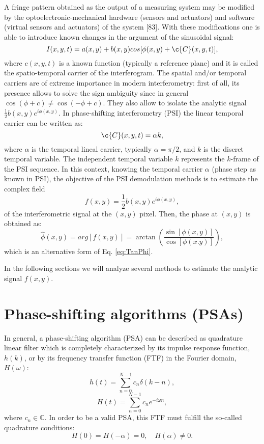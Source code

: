 A fringe pattern obtained as the output of a measuring system may be modified
by the optoelectronic-mechanical hardware (sensors and actuators) and software
(virtual sensors and actuators) of the system [83]. With these modifications one
is able to introduce known changes in the argument of the sinusoidal signal:
\begin{equation}\label{eq:FringePatternTemporal}
 I(x,y,t)=a(x,y)+b(x,y)cos[\phi(x,y) + \c{C}(x,y,t)],
\end{equation}
where $c(x,y,t)$ is a known function (typically a reference plane) and it is 
called the spatio-temporal carrier of the interferogram. The spatial and/or 
temporal carriers are of extreme importance in modern interferometry: first of 
all, its presence allows to solve the sign ambiguity since in general 
$\cos(\phi+c)\not=\cos(-\phi+c)$. They also allow to isolate the analytic signal
$\frac{1}{2} b(x,y)e^{i \phi(x,y)}$. In phase-shifting interferometry (PSI) the
linear temporal carrier can be written as:
\begin{equation}\label{PSIcarrier}
 \c{C}(x,y,t)=\alpha k,
\end{equation}
where $\alpha$ is the temporal lineal carrier, typically $\alpha=\pi/2$, and $k$
is the discret temporal variable. The independent temporal variable $k$ represents
the $k$-frame of the PSI sequence. In this context, knowing the temporal carrier 
$\alpha$ (phase step as known in PSI), the objective of the PSI demodulation 
methods is to estimate the complex field
\begin{equation}\label{eq:Complexfield}
 f(x,y)=\frac{1}{2}b(x,y)e^{i\phi(x,y)},
\end{equation}
of the interferometric signal at the $(x,y)$ pixel. Then, the phase at $(x,y)$ 
is obtained as:
\begin{equation}\label{eq:PSIphase}
  \hat{\phi}(x,y)=arg[f(x,y)]=\arctan\left(\frac{\sin[\phi(x,y)]}{\cos[\phi(x.y)]}
\right),
\end{equation}
which is an alternative form of Eq. \eqref{eq:TanPhi}.

In the following sections we will analyze several methods to estimate the 
analytic signal $f(x,y)$.

\section{Phase-shifting algorithms (PSAs)}

In general, a phase-shifting algorithm (PSA) can be described as quadrature linear
filter which is completely characterized by its impulse response function, $h(k)$,
or by its frequency transfer function (FTF) in the Fourier domain, $H(\omega)$:
\begin{equation}
 h(t)=\sum^{N-1}_{n=0} c_n \delta(k-n),
\end{equation}
\begin{equation}
 H(t)=\sum^{N-1}_{n=0} c_n e^{-i\omega n},
\end{equation}
where ${c_n} \in \mathbb{C}$. In order to be a valid PSA, this FTF must fulfill
the so-called quadrature conditions:
\begin{equation}
 H(0)=H(-\alpha)=0, \quad H(\alpha)\not=0.
\end{equation}

